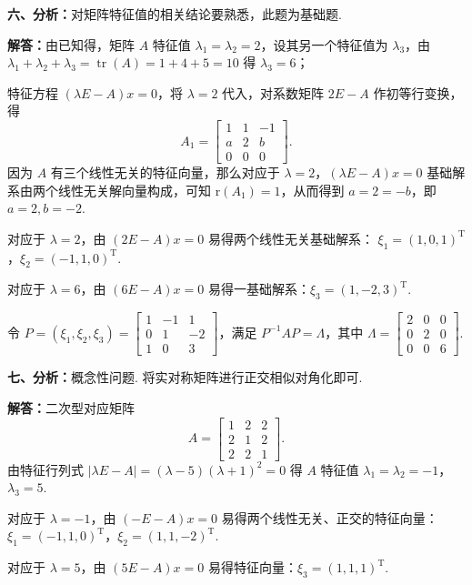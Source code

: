 \documentclass[a4paper,11pt]{ctexart}
\newcommand{\tr}{\operatorname{tr}}
\newcommand{\rk}{\mathrm{r}}
\newcommand{\T}{\mathrm{T}}
\begin{document}
\textbf{六、分析：}对矩阵特征值的相关结论要熟悉，此题为基础题.

\textbf{解答：}由已知得，矩阵 $A$ 特征值 $\lambda_1 = \lambda_2 = 2$，设其另一个特征值为 $\lambda_3$，由 $\lambda_1 + \lambda_2 + \lambda_3 = \tr(A) = 1 + 4 + 5 = 10$ 得 $\lambda_3 = 6$；

特征方程 $(\lambda E - A)x = 0$，将 $\lambda = 2$ 代入，对系数矩阵 $2E - A$ 作初等行变换，得
\[
  A_1 = \begin{bmatrix}
    1 & 1 & -1 \\
    a & 2 & b \\
    0 & 0 & 0
  \end{bmatrix}.
\]
因为 $A$ 有三个线性无关的特征向量，那么对应于 $\lambda = 2$，$(\lambda E - A)x = 0$ 基础解系由两个线性无关解向量构成，可知 $\rk(A_1) = 1$，从而得到 $a = 2 = -b$，即 $a = 2, b = -2$.

对应于 $\lambda = 2$，由 $(2E - A)x = 0$ 易得两个线性无关基础解系：
$\xi_1 = (1, 0, 1)^{\T}$，$\xi_2 = (-1, 1, 0)^{\T}$.

对应于 $\lambda = 6$，由 $(6E - A)x = 0$ 易得一基础解系：$\xi_3 = (1, -2, 3)^{\T}$.

令 $P = (\xi_1, \xi_2, \xi_3) = \begin{bmatrix} 1 & -1 & 1 \\ 0 & 1 & -2 \\ 1 & 0 & 3 \end{bmatrix}$，满足 $P^{-1}AP = \Lambda$，其中 $\Lambda = \begin{bmatrix} 2 & 0 & 0 \\ 0 & 2 & 0 \\ 0 & 0 & 6 \end{bmatrix}$.

\vspace{0.8em}

\textbf{七、分析：}概念性问题. 将实对称矩阵进行正交相似对角化即可.

\textbf{解答：}二次型对应矩阵
\[
  A = \begin{bmatrix}
    1 & 2 & 2 \\
    2 & 1 & 2 \\
    2 & 2 & 1
  \end{bmatrix}.
\]
由特征行列式 $|\lambda E - A| = (\lambda - 5)(\lambda + 1)^2 = 0$ 得 $A$ 特征值 $\lambda_1 = \lambda_2 = -1$，$\lambda_3 = 5$.

对应于 $\lambda = -1$，由 $(-E - A)x = 0$ 易得两个线性无关、正交的特征向量：$\xi_1 = (-1, 1, 0)^{\T}$，$\xi_2 = (1, 1, -2)^{\T}$.

对应于 $\lambda = 5$，由 $(5E - A)x = 0$ 易得特征向量：$\xi_3 = (1, 1, 1)^{\T}$.
\end{document}
